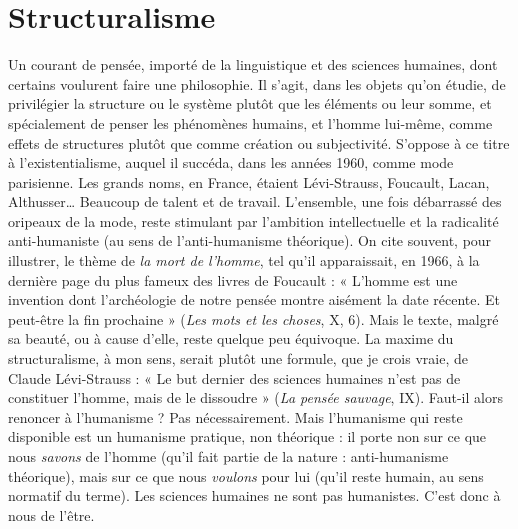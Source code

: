\section{Structuralisme}
Un courant de pensée, importé de la linguistique et
des sciences humaines, dont certains voulurent faire
une philosophie. Il s’agit, dans les objets qu’on étudie, de privilégier la structure
ou le système plutôt que les éléments ou leur somme, et spécialement de
penser les phénomènes humains, et l’homme lui-même, comme effets de structures
plutôt que comme création ou subjectivité. S’oppose à ce titre à l’existentialisme,
auquel il succéda, dans les années 1960, comme mode parisienne. Les
grands noms, en France, étaient Lévi-Strauss, Foucault, Lacan, Althusser…
Beaucoup de talent et de travail. L'ensemble, une fois débarrassé des oripeaux
de la mode, reste stimulant par l’ambition intellectuelle et la radicalité anti-humaniste
(au sens de l’anti-humanisme théorique). On cite souvent, pour
illustrer, le thème de {\it la mort de l'homme}, tel qu’il apparaissait, en 1966, à la
dernière page du plus fameux des livres de Foucault : « L'homme est une invention
dont l’archéologie de notre pensée montre aisément la date récente. Et
peut-être la fin prochaine » ({\it Les mots et les choses}, X, 6). Mais le texte, malgré sa
beauté, ou à cause d’elle, reste quelque peu équivoque. La maxime du structuralisme,
à mon sens, serait plutôt une formule, que je crois vraie, de Claude
Lévi-Strauss : « Le but dernier des sciences humaines n’est pas de constituer
l'homme, mais de le dissoudre » ({\it La pensée sauvage}, IX). Faut-il alors renoncer
à l’humanisme ? Pas nécessairement. Mais l’humanisme qui reste disponible est
un humanisme pratique, non théorique : il porte non sur ce que nous {\it savons} de
l’homme (qu’il fait partie de la nature : anti-humanisme théorique), mais sur ce
que nous {\it voulons} pour lui (qu’il reste humain, au sens normatif du terme). Les
sciences humaines ne sont pas humanistes. C’est donc à nous de l’être.

